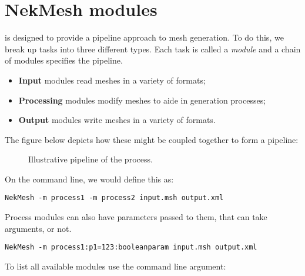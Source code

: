 \section{NekMesh modules}

\mc is designed to provide a pipeline approach to mesh generation. To do this,
we break up tasks into three different types. Each task is called a
\emph{module} and a chain of modules specifies the pipeline.
%
\begin{itemize}
  \item \textbf{Input} modules read meshes in a variety of formats;
  \item \textbf{Processing} modules modify meshes to aide in generation processes;
  \item \textbf{Output} modules write meshes in a variety of formats.
\end{itemize}
%
The figure below depicts how these might be coupled together to form a pipeline:
%
\begin{figure}
  \begin{center}
  \end{center}
  \caption{Illustrative pipeline of the \mc process.}
  \label{fig:util:mc:pipeline}
\end{figure}
%
On the command line, we would define this as:
%
\begin{lstlisting}[style=BashInputStyle]
  NekMesh -m process1 -m process2 input.msh output.xml
\end{lstlisting}
%
Process modules can also have parameters passed to them, that can take
arguments, or not.
%
\begin{lstlisting}[style=BashInputStyle]
  NekMesh -m process1:p1=123:booleanparam input.msh output.xml
\end{lstlisting}
%
To list all available modules use the  command line argument:
